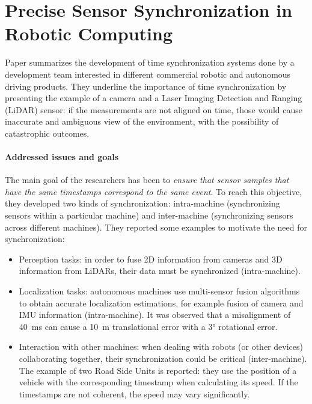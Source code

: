 \section{Precise Sensor Synchronization in Robotic Computing}
Paper \cite{liu2021brief} summarizes the development of time synchronization systems done by a development team interested in different commercial robotic and autonomous driving products. They underline the importance of time synchronization by presenting the example of a camera and a Laser Imaging Detection and Ranging (LiDAR) sensor: if the measurements are not aligned on time, those would cause inaccurate and ambiguous view of the environment, with the possibility of catastrophic outcomes.

\paragraph{Addressed issues and goals} The main goal of the researchers has been to \textit{ensure that sensor samples that have the same timestamps correspond to the same event}. To reach this objective, they developed two kinds of synchronization: intra-machine (synchronizing sensors within a particular machine) and inter-machine (synchronizing sensors across different machines). They reported some examples to motivate the need for synchronization:
\begin{itemize}
    \item Perception tasks: in order to fuse 2D information from cameras and 3D information from LiDARs, their data must be synchronized (intra-machine).
    \item Localization tasks: autonomous machines use multi-sensor fusion algorithms to obtain accurate localization estimations, for example fusion of camera and IMU information (intra-machine). It was observed that a misalignment of 40~ms can cause a 10~m translational error with a 3° rotational error.
    \item Interaction with other machines: when dealing with robots (or other devices) collaborating together, their synchronization could be critical (inter-machine). The example of two Road Side Units is reported: they use the position of a vehicle with the corresponding timestamp when calculating its speed. If the timestamps are not coherent, the speed may vary significantly.      
\end{itemize}

